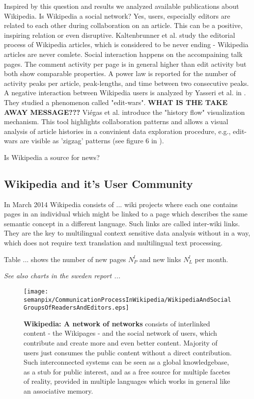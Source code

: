 \documentclass[a4paper,10pt]{scrbook}
\begin{document}
Inspired by this question and results we analyzed available publications about Wikipedia. Is Wikipedia a social network? Yes, users, especially editors are related to each other during collaboration on an article. This can be a positive, inspiring relation or even disruptive. Kaltenbrunner et al. \cite{Kaltenbrunner2012} study the editorial process of Wikipedia articles, which is considered to be never ending - Wikipedia articles are never comlete. Social interaction happens on the accompaining talk pages. The comment activity per page is in general higher than edit activity but both show comparable properties. A power law is reported for the number of activity peaks per article, peak-lengths, and time between two consecutive peaks. A negative interaction between Wikipedia users is analyzed by Yasseri et al. in \cite{EDIT.WARS}. They studied a phenomenon called "edit-wars". \textbf{WHAT IS THE TAKE AWAY MESSAGE???} Vi\'{e}gas et al. introduce the "history flow" visualization mechanism. This tool highlights collaboration patterns and allows a visual analysis of article histories in a convinient data exploration procedure, e.g., edit-wars are visible as 'zigzag' patterns (see figure 6 in \cite{Viegas2004}).  

Is Wikipedia a source for news?

\subsection{Wikipedia and it's User Community}
\cite{Zlatic2006}

In March 2014 Wikipedia consists of ... wiki projects where each one contains pages in an individual which might be linked to a page which describes the same semantic concept in a different language. Such links are called inter-wiki links. They are the key to multilingual context sensitive data analysis without in a way, which does not require text translation and multilingual text processing. 

Table ... shows the number of new pages $N_P^{l}$ and new links $N_L^{l}$ per month. 

\textit{See also charts in the sweden report ... }

\begin{figure}[h!]
  \centering
      \texttt{[image: semanpix/CommunicationProcessInWikipedia/WikipediaAndSocialGroupsOfReadersAndEditors.eps]}
     \caption[\textbf{Wikipedia: is a network of networks (NoN)} which consists of interlinked content and the social network of users.]{\textbf{Wikipedia: A network of networks} consists of interlinked content - the Wikipages - and the social network of users, which contribute and create more and even better content. Majority of users just consumes the public content without a direct contribution. Such interconnected systems can be seen as a global knowledgebase, as a stub for public interest, and as a free source for multiple facetes of reality, provided in multiple languages which works in general like an associative memory.}
     \label{fig.WikiNON} 
\end{figure}
\end{document}
